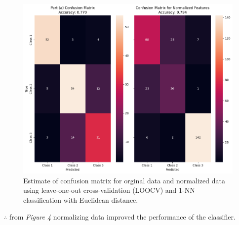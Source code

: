 \documentclass{article}
\begin{document}
\begin{figure}[htbp]
\includegraphics[width=1\textwidth]{q10_c.png} 
\caption{Estimate of confusion matrix for orginal data and normalized data using leave-one-out cross-validation (LOOCV) and 1-NN classification with Euclidean distance.}
\end{figure}

\parbox{\textwidth}{$\therefore$ from \textit{Figure 4} normalizing data improved the performance of the classifier.}\\
\end{document}
